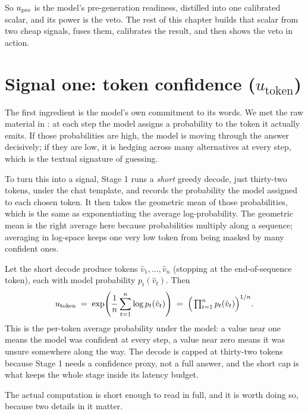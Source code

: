 So $u_{\text{pre}}$ is the model's pre-generation readiness, distilled into one calibrated
scalar, and its power is the veto. The rest of this chapter builds that scalar from
two cheap signals, fuses them, calibrates the result, and then shows the veto in
action.

\section{Signal one: token confidence ($u_{\text{token}}$)}
\label{sec:upre-utoken}

The first ingredient is the model's own commitment to its words. We met the raw
material in : at each step the model assigns a probability to
the token it actually emits. If those probabilities are high, the model is moving
through the answer decisively; if they are low, it is hedging across many
alternatives at every step, which is the textual signature of guessing.

To turn this into a signal, Stage 1 runs a \emph{short} greedy decode, just
thirty-two tokens, under the chat template, and records the probability the model
assigned to each chosen token. It then takes the geometric mean of those
probabilities, which is the same as exponentiating the average log-probability.
The geometric mean is the right average here because probabilities multiply along
a sequence; averaging in log-space keeps one very low token from being masked by
many confident ones.

\begin{precise}
Let the short decode produce tokens $\hat v_1, \dots, \hat v_n$ (stopping at the
end-of-sequence token), each with model probability $p_t(\hat v_t)$. Then
\[
  u_{\text{token}}
  \;=\;
  \exp\!\left(\frac{1}{n}\sum_{t=1}^{n}\log p_t(\hat v_t)\right)
  \;=\;
  \Big(\textstyle\prod_{t=1}^{n} p_t(\hat v_t)\Big)^{1/n}.
\]
This is the per-token average probability under the model: a value near one means
the model was confident at every step, a value near zero means it was unsure
somewhere along the way. The decode is capped at thirty-two tokens because Stage 1
needs a confidence proxy, not a full answer, and the short cap is what keeps the
whole stage inside its latency budget.
\end{precise}

The actual computation is short enough to read in full, and it is worth doing so,
because two details in it matter.


